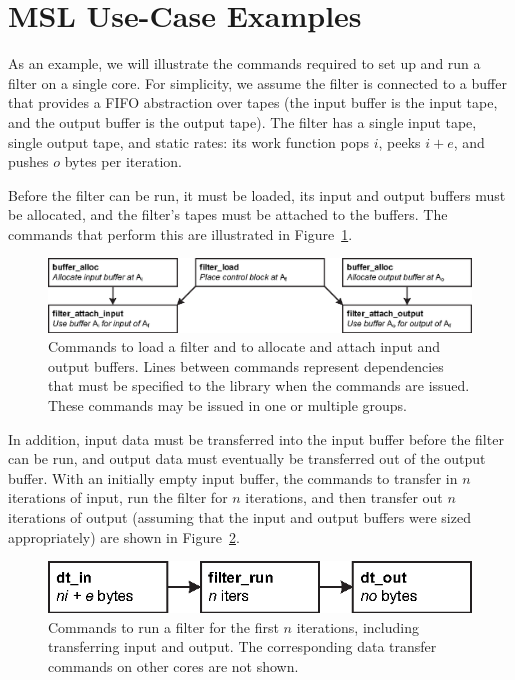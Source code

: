 \section{MSL Use-Case Examples}

As an example, we will illustrate the commands required to set up and
run a filter on a single core. For simplicity, we assume the filter is
connected to a buffer that provides a FIFO abstraction over tapes (the
input buffer is the input tape, and the output buffer is the output
tape). The filter has a single input tape, single output tape, and
static rates: its work function pops $i$, peeks $i+e$, and pushes $o$
bytes per iteration.

Before the filter can be run, it must be loaded, its input and output
buffers must be allocated, and the filter's tapes must be attached to the
buffers. The commands that perform this are illustrated in
Figure~\ref{fig:lib:init}.

\begin{figure}[!htb]
\begin{center}
\includegraphics[scale=.55]{figs/init-efont}
\end{center}
\caption[Commands to set up a filter.]{Commands to load a filter and to allocate and attach input and output buffers. Lines between commands represent dependencies that must be specified to the library when the commands are issued. These commands may be issued in one or multiple groups.}
\label{fig:lib:init}
\end{figure}

In addition, input data must be transferred into the input buffer before the filter can be run, and output data must eventually be transferred out of the output buffer. With an initially empty input buffer, the commands to transfer in $n$ iterations of input, run the filter for $n$ iterations, and then transfer out $n$ iterations of output (assuming that the input and output buffers were sized appropriately) are shown in Figure~\ref{fig:lib:run}.

\begin{figure}[!htb]
\begin{center}
\includegraphics{figs/run-efont}
\end{center}
\caption[Commands to run a filter.]{Commands to run a filter for the
  first $n$ iterations, including transferring input and output. The
  corresponding data transfer commands on other cores are not shown.}
\label{fig:lib:run}
\end{figure}

